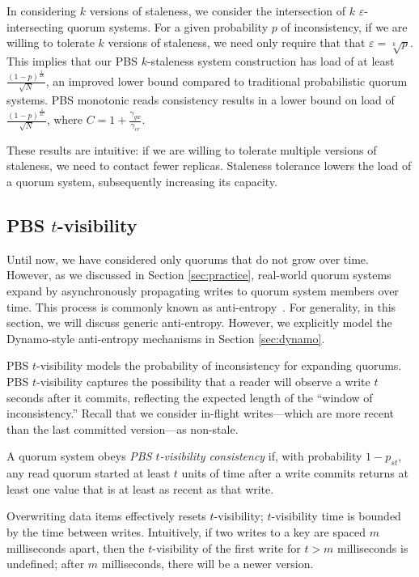 \documentclass{vldb}
\newcommand{\subsectionskip}{-0em}
\begin{document}
In considering $k$ versions of staleness, we consider the intersection
of $k$ $\varepsilon$-intersecting quorum systems.  For a given
probability $p$ of inconsistency, if we are willing to tolerate $k$
versions of staleness, we need only require that that $\varepsilon =
\sqrt[k]{p}$.  This implies that our PBS $k$-staleness system
construction has load of at least
$\frac{(1-p)^{\frac{1}{2k}}}{\sqrt{N}}$, an improved lower bound
compared to traditional probabilistic quorum systems.  PBS monotonic
reads consistency results in a lower bound on load of
$\frac{(1-p)^{\frac{1}{2C}}}{\sqrt{N}}$, where
$C=1+\frac{\gamma_{gw}}{\gamma_{cr}}$.

These results are intuitive: if we are willing to tolerate multiple
versions of staleness, we need to contact fewer replicas.  Staleness
tolerance lowers the load of a quorum system, subsequently increasing
its capacity.

\vspace{\subsectionskip}\subsection{PBS $t$-visibility}
\label{sec:tvis}

Until now, we have considered only quorums that do not grow over time.
However, as we discussed in Section \ref{sec:practice}, real-world
quorum systems expand by asynchronously propagating writes to quorum
system members over time.  This process is commonly known as
anti-entropy~\cite{antientropy}.  For generality, in this section, we
will discuss generic anti-entropy. However, we explicitly model the
Dynamo-style anti-entropy mechanisms in Section \ref{sec:dynamo}.

PBS $t$-visibility models the probability of inconsistency for
expanding quorums.  PBS $t$-visibility captures the possibility that a
reader will observe a write $t$ seconds after it commits, reflecting
the expected length of the ``window of inconsistency.''  Recall that
we consider in-flight writes---which are more recent than the last
committed version---as non-stale.

\begin{definition}
A quorum system obeys \textit{PBS $t$-visibility consistency} if, with
probability $1-p_{st}$, any read quorum started at least $t$ units
of time after a write commits returns at least one value
that is at least as recent as that write.
\end{definition}

Overwriting data items effectively resets $t$-visibility;
$t$-visibility time is bounded by the time between writes.
Intuitively, if two writes to a key are spaced $m$ milliseconds apart,
then the $t$-visibility of the first write for $t > m$ milliseconds is
undefined; after $m$ milliseconds, there will be a newer version.
\end{document}
